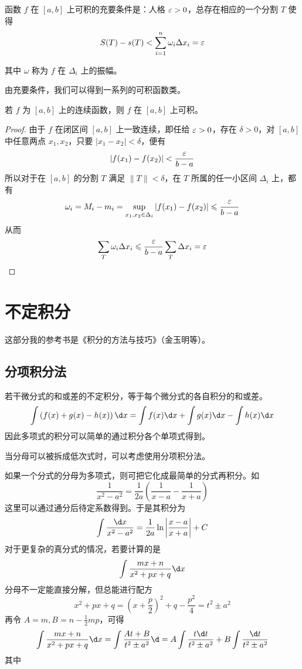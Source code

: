 \begin{theorem}
	函数 $f$ 在 $[a,b]$ 上可积的充要条件是：人格 $\varepsilon >0$，总存在相应的一个分割 $T$ 使得
	\[ S(T) - s(T) < \sum_{i=1}^n\omega_i\Delta x_i = \varepsilon \]
\end{theorem}

其中 $\omega$ 称为 $f$ 在 $\Delta_i$ 上的振幅。

由充要条件，我们可以得到一系列的可积函数类。

\begin{theorem}
	若 $f$ 为 $[a,b]$ 上的连续函数，则 $f$ 在 $[a,b]$ 上可积。
\end{theorem}
\begin{proof}
	由于 $f$ 在闭区间 $[a,b]$ 上一致连续，即任给 $\varepsilon > 0$，存在 $\delta>0$，对 $[a,b]$ 中任意两点 $x_1,x_2$，只要 $|x_1-x_2|<\delta$，便有
	\[ |f(x_1)-f(x_2)| < \frac{\varepsilon}{b-a} \]
	所以对于在 $[a,b]$ 的分割 $T$ 满足 $\|T\| < \delta$，在 $T$ 所属的任一小区间 $\Delta_i$ 上，都有
	\[ \omega_i = M_i-m_i = \sup_{x_1,x_2\in\Delta_i}|f(x_1)-f(x_2)| \leqslant \frac{\varepsilon}{b-a} \]
	从而
	\[ \sum_{T}\omega_i\Delta x_i \leqslant \frac{\varepsilon}{b-a}\sum_T\Delta x_i = \varepsilon \]
\end{proof}



\section{不定积分}

这部分我的参考书是《积分的方法与技巧》（金玉明等）。

\subsection{分项积分法}

若干微分式的和或差的不定积分，等于每个微分式的各自积分的和或差。
\[ \int\left( f(x)+g(x)-h(x) \right)\d x = \int f(x)\d x + \int g(x)\d x - \int h(x)\d x \]
因此多项式的积分可以简单的通过积分各个单项式得到。

当分母可以被拆成低次式时，可以考虑使用分项积分法。

如果一个分式的分母为多项式，则可把它化成最简单的分式再积分。如
\[ \frac{1}{x^2-a^2} = \frac{1}{2a}\left( \frac{1}{x-a}-\frac{1}{x+a} \right) \]
这里可以通过通分后待定系数得到。于是其积分为
\[ \int \frac{\d x}{x^2-a^2} = \frac{1}{2a}\ln\left|\frac{x-a}{x+a}\right|+C \]
对于更复杂的真分式的情况，若要计算的是
\[ \int \frac{mx+n}{x^2+px+q} \d x \]
分母不一定能直接分解，但总能进行配方
\[ x^2+px+q = \left(x+\frac{p}{2}\right)^2+q-\frac{p^2}{4} = t^2 \pm a^2 \]
再令 $A=m,B=n-\frac12mp$，可得
\[ \int \frac{mx+n}{x^2+px+q} \d x = \int \frac{At+B}{t^2 \pm a^2} \d
	= A\int \frac{t\d t}{t^2 \pm a^2} + B\int \frac{\d t}{t^2 \pm a^2}\]
其中

